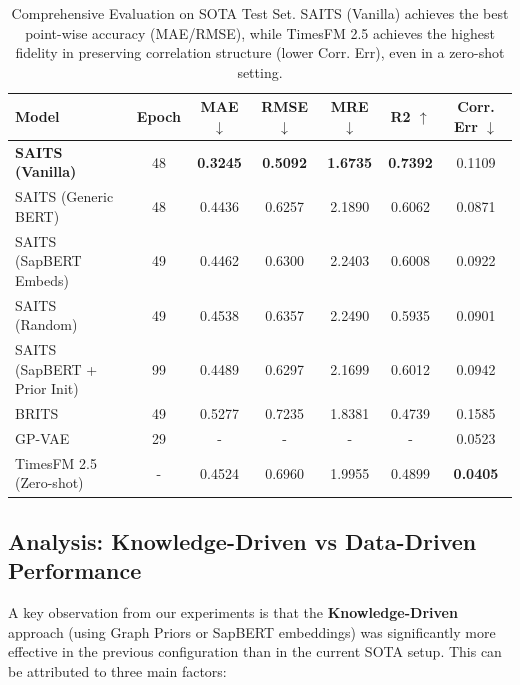 \begin{table}[h]
\centering
\begin{tabular}{lcccccc}
\toprule
\textbf{Model} & \textbf{Epoch} & \textbf{MAE} $\downarrow$ & \textbf{RMSE} $\downarrow$ & \textbf{MRE} $\downarrow$ & \textbf{R2} $\uparrow$ & \textbf{Corr. Err} $\downarrow$ \\
\midrule
\textbf{SAITS (Vanilla)} & 48 & \textbf{0.3245} & \textbf{0.5092} & \textbf{1.6735} & \textbf{0.7392} & 0.1109 \\
SAITS (Generic BERT) & 48 & 0.4436 & 0.6257 & 2.1890 & 0.6062 & 0.0871 \\
SAITS (SapBERT Embeds) & 49 & 0.4462 & 0.6300 & 2.2403 & 0.6008 & 0.0922 \\
SAITS (Random) & 49 & 0.4538 & 0.6357 & 2.2490 & 0.5935 & 0.0901 \\
SAITS (SapBERT + Prior Init) & 99 & 0.4489 & 0.6297 & 2.1699 & 0.6012 & 0.0942 \\
BRITS & 49 & 0.5277 & 0.7235 & 1.8381 & 0.4739 & 0.1585 \\
GP-VAE & 29 & - & - & - & - & 0.0523 \\
TimesFM 2.5 (Zero-shot) & - & 0.4524 & 0.6960 & 1.9955 & 0.4899 & \textbf{0.0405} \\
\bottomrule
\end{tabular}
\caption{Comprehensive Evaluation on SOTA Test Set. SAITS (Vanilla) achieves the best point-wise accuracy (MAE/RMSE), while TimesFM 2.5 achieves the highest fidelity in preserving correlation structure (lower Corr. Err), even in a zero-shot setting.}
\label{tab:results}
\end{table}

\subsection{Analysis: Knowledge-Driven vs Data-Driven Performance}
A key observation from our experiments is that the \textbf{Knowledge-Driven} approach (using Graph Priors or SapBERT embeddings) was significantly more effective in the previous configuration than in the current SOTA setup. This can be attributed to three main factors:

